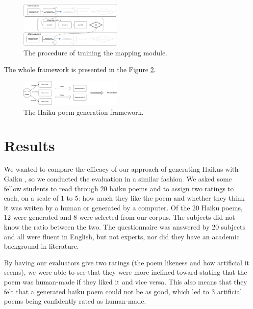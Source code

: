 \documentclass{acm_proc_article-sp}
\begin{document}
\begin{figure}[h!]
	\centering
	\includegraphics[width=0.45\textwidth]{flowchart/training.pdf}
    \caption[The procedure of training the mapping module.]{The procedure of training the mapping module.}
    \label{fig:training}
\end{figure}

The whole framework is presented in the Figure \ref{fig:fw}.

\begin{figure}[h!]
	\centering
	\includegraphics[width=0.45\textwidth]{flowchart/fw.pdf}
    \caption[The Haiku poem generation framework.]{The Haiku poem generation framework.}
    \label{fig:fw}
\end{figure}

\section{Results}

We wanted to compare the efficacy of our approach of generating Haikus with Gaiku \cite{netzer2009gaiku}, so we conducted the evaluation in a similar fashion. We asked some fellow students to read through 20 haiku poems and to assign two ratings to each, on a scale of 1 to 5: how much they like the poem and whether they think it was writen by a human or generated by a computer. Of the 20 Haiku poems, 12 were generated and 8 were selected from our corpus. The subjects did not know the ratio between the two. The questionnaire was answered by 20 subjects and all were fluent in English, but not experts, nor did they have an academic background in literature.

By having our evaluators give two ratings (the poem likeness and how artificial it seems), we were able to see that they were more inclined toward stating that the poem was human-made if they liked it and vice versa. This also means that they felt that a generated haiku poem could not be as good, which led to 3 artificial poems being confidently rated as human-made.
\end{document}
